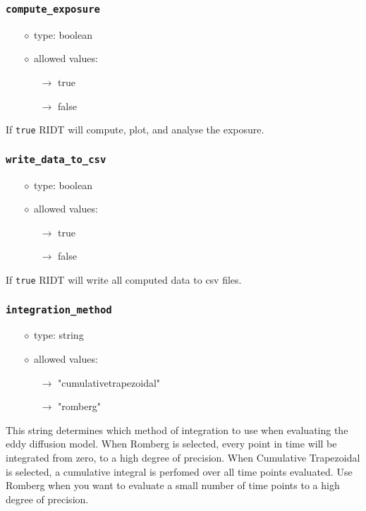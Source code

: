 \documentclass[]{article}
\def\code#1{\texttt{#1}}
\begin{document}
\subsubsection{\code{compute\_exposure}}
\begin{itemize}
    \item[$\diamond$] type: boolean
    \item[$\diamond$] allowed values:
    \begin{itemize}
        \item[$\rightarrow$] true
        \item[$\rightarrow$] false
    \end{itemize}
\end{itemize}
If \code{true} RIDT will compute, plot, and analyse the exposure.

\subsubsection{\code{write\_data\_to\_csv}}
\begin{itemize}
    \item[$\diamond$] type: boolean
    \item[$\diamond$] allowed values:
    \begin{itemize}
        \item[$\rightarrow$] true
        \item[$\rightarrow$] false
    \end{itemize}
\end{itemize}
If \code{true} RIDT will write all computed data to csv files.

\subsubsection{\code{integration\_method}}\label{sec:integrationmethod}
\begin{itemize}
    \item[$\diamond$] type: string 
    \item[$\diamond$] allowed values:
    \begin{itemize}
        \item[$\rightarrow$] "cumulativetrapezoidal"
        \item[$\rightarrow$] "romberg"
    \end{itemize}
\end{itemize}
This string determines which method of integration to use when evaluating the
eddy diffusion model. When Romberg is selected, every point in time will be
integrated from zero, to a high degree of precision. When Cumulative Trapezoidal
is selected, a cumulative integral is perfomed over all time points evaluated.
Use Romberg when you want to evaluate a small number of time points to a high
degree of precision.
\end{document}
